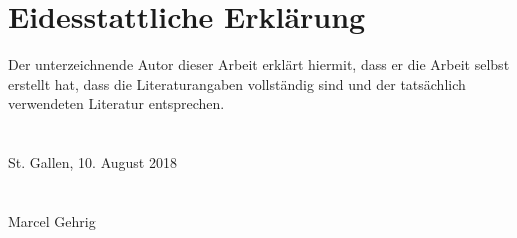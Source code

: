 \chapter{Eidesstattliche Erklärung}

	Der unterzeichnende Autor dieser Arbeit erklärt hiermit, dass er die Arbeit selbst erstellt hat,
	dass die Literaturangaben vollständig sind und der tatsächlich verwendeten Literatur entsprechen.\\
	\\
 	\\
	St. Gallen, 10. August 2018\\
    \\
    \\
  	Marcel Gehrig\\
